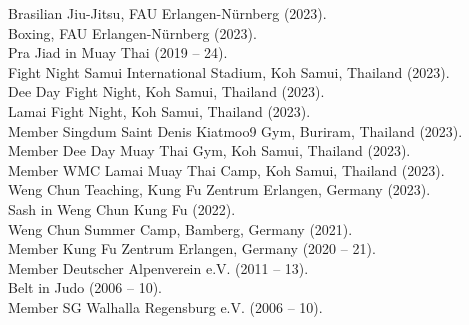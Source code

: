 \documentclass[a4paper,11pt]{article}
\newcommand{\years}[1]{\marginnote{\scriptsize #1}}
\begin{document}
\years{Sports}
Brasilian Jiu-Jitsu, FAU Erlangen-Nürnberg (2023).\\
Boxing, FAU Erlangen-Nürnberg (2023).\\
{\Large\color{amber}\circ} {\Large\color{bittersweet}\circ} {\Large\color{darkcyan}\circ} {\Large\color{denim}\circ} {\Large\color{darkmagenta}\circ} {\Large\color{red}\circ} {\Large\color{brown}\circ}  {\Large\color{black}\circ} Pra Jiad in Muay Thai (2019 -- 24).\\
Fight Night Samui International Stadium, Koh Samui, Thailand (2023).\\
Dee Day Fight Night, Koh Samui, Thailand (2023).\\
Lamai Fight Night, Koh Samui, Thailand (2023).\\
Member Singdum Saint Denis Kiatmoo9 Gym, Buriram, Thailand (2023).\\
Member Dee Day Muay Thai Gym, Koh Samui, Thailand (2023).\\
Member WMC Lamai Muay Thai Camp, Koh Samui, Thailand (2023).\\
Weng Chun Teaching, Kung Fu Zentrum Erlangen, Germany (2023).\\
{\Large\color{amber}\circ} {\Large\color{bittersweet}\circ} {\Large\color{darkcyan}\circ} Sash in Weng Chun Kung Fu (2022).\\
Weng Chun Summer Camp, Bamberg, Germany (2021).\\
Member Kung Fu Zentrum Erlangen, Germany (2020 -- 21).\\
Member Deutscher Alpenverein e.V. (2011 -- 13).\\
{\Large\color{amber}\circ} {\Large\color{bittersweet}\circ} {\Large\color{darkcyan}\circ} {\Large\color{denim}\circ} Belt in Judo (2006 -- 10).\\
Member SG Walhalla Regensburg e.V. (2006 -- 10).
\end{document}
